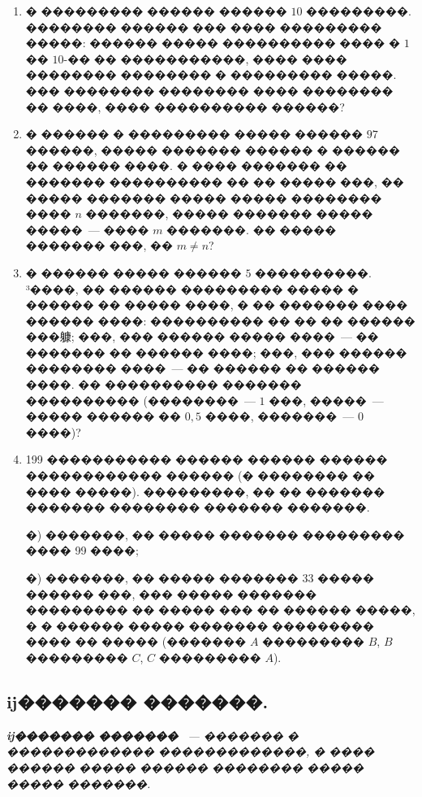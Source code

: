 \documentclass[a4paper,12pt]{article}
\begin{document}
\begin{enumerate}
\item � ��������� ������ ������ $10$ ���������. �������� ������ ��� ���� ��������� �����: ������ ����� ���������� ���� � $1$ �� $10$-�� �� �����������, ���� ���� �������� �������� � ��������� �����. ��� �������� �������� ���� �������� �� ����, ���� ���������� ������?

\item � ������ � ��������� ����� ������ $97$ ������, ����� ������� ������ � ������ �� ������ ����. � ���� ������� �� ������� ���������� �� �� ����� ���, �� ����� ������� ����� ����� �������� ���� $n$ �������, ����� ������� ����� �����~--- ���� $m$ �������. �� ����� ������� ���, �� $m\neq n$?

\item � ������ ����� ������ $5$ ����������. ³����, �� ������ ��������� ����� � ������ �� ����� ����, � �� ������� ���� ������ ����: ���������� �� �� �� ������ ���躿; ���, ��� ������ ����� ����~--- �� ������� �� ������ ����; ���, ��� ������ �������� ����~--- �� ������ �� ������ ����. �� ���������� ������� ���������� (��������~--- $1$ ���, �����~--- ����� ������ �� $0,5$ ����, �������~--- $0$ ����)?

\item 199 ����������� ������ ������ ������ ������������ ������ (� �������� �� ���� �����). ���������, �� �� ������� ������� �������� ������� �������.

    �) �������, �� ����� ������� ��������� ���� 99 ����;

    �) �������, �� ����� ������� 33 ����� ������ ���, ��� ����� ������� ��������� �� ����� ��� �� ������ �����, � � ������ ����� ������� ��������� ���� �� ����� (������� $A$ ��������� $B$, $B$ ��������� $C$, $C$ ��������� $A$).
\end{enumerate}









\newpage

\begin{center}
\section*{ĳ������� �������.}
\end{center}

\textit{\textbf{ĳ������� �������} ~--- ������� � ������������� �������������, � ���� ������ ����� ������ �������� ����� ����� �������.\\}
\end{document}
